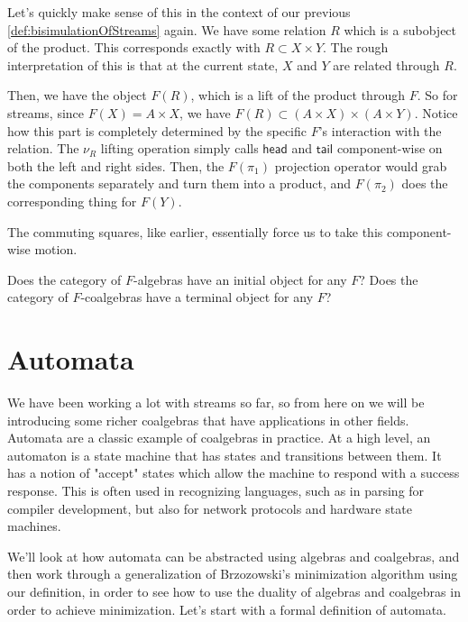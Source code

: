 Let's quickly make sense of this in the context of our previous \cref{def:bisimulationOfStreams} again.
We have some relation $R$ which is a subobject of the product.
This corresponds exactly with $R \subset X \times Y$.
The rough interpretation of this is that at the current state, $X$ and $Y$ are related through $R$.

Then, we have the object $F(R)$, which is a lift of the product through $F$.
So for streams, since $F(X) = A \times X$, we have $F(R) \subset (A \times X) \times (A \times Y)$.
Notice how this part is completely determined by the specific $F$'s interaction with the relation.
The $\nu_R$ lifting operation simply calls $\mathsf{head}$ and $\mathsf{tail}$ component-wise on both the left and right sides.
Then, the $F(\pi_1)$ projection operator would grab the components separately and turn them into a product, and $F(\pi_2)$ does the corresponding thing for $F(Y)$.

The commuting squares, like earlier, essentially force us to take this component-wise motion.

\begin{refinementexercise}
    Does the category of $F$-algebras have an initial object for any $F$? Does the category of $F$-coalgebras have a terminal object for any $F$?
\end{refinementexercise}

\section{Automata}

We have been working a lot with streams so far, so from here on we will be introducing some richer coalgebras that have applications in other fields.
Automata are a classic example of coalgebras in practice.
At a high level, an automaton is a state machine that has states and transitions between them.
It has a notion of "accept" states which allow the machine to respond with a success response.
This is often used in recognizing languages, such as in parsing for compiler development, but also for network protocols and hardware state machines. 

We'll look at how automata can be abstracted using algebras and coalgebras, and then work through a generalization of Brzozowski's minimization algorithm using our definition, in order to see how to use the duality of algebras and coalgebras in order to achieve minimization.
Let's start with a formal definition of automata.

